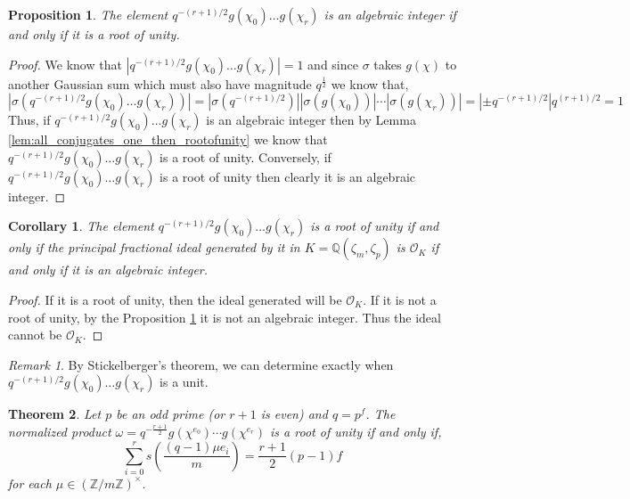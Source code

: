 \documentclass{article}
\newcommand{\Z}{\mathbb{Z}}
\newcommand{\Q}{\mathbb{Q}}
\newcommand{\iO}{\mathcal{O}}
\newtheorem{theorem}{Theorem}[section]
\newtheorem{corollary}{Corollary}[theorem]
\newtheorem{proposition}[theorem]{Proposition}
\theoremstyle{definition}
\theoremstyle{definition}
\theoremstyle{remark}
\newtheorem*{remark}{Remark}
\begin{document}
\begin{proposition} \label{prop:gauss_sum_prod_alg_int}
The element $q^{-(r+1)/2} g(\chi_0) \dots g(\chi_r)$ is an algebraic integer if and only if it is a root of unity.
\end{proposition}
\begin{proof}
We know that $|q^{-(r+1)/2} g(\chi_0) \dots g(\chi_r)| = 1$ and since $\sigma$ takes $g(\chi)$ to another Gaussian sum which must also have magnitude $q^{\frac{1}{2}}$ we know that,
\[ |\sigma(q^{-(r+1)/2} g(\chi_0) \dots g(\chi_r))| = |\sigma(q^{-(r+1)/2})| |\sigma(g(\chi_0))| \cdots |\sigma(g(\chi_r))| = | \pm q^{-(r+1)/2} | q^{(r+1)/2} = 1 \]
Thus, if $q^{-(r+1)/2} g(\chi_0) \dots g(\chi_r)$ is an algebraic integer then by Lemma \ref{lem:all_conjugates_one_then_rootofunity} we know that $q^{-(r+1)/2} g(\chi_0) \dots g(\chi_r)$ is a root of unity. Conversely, if $q^{-(r+1)/2} g(\chi_0) \dots g(\chi_r)$ is a root of unity then clearly it is an algebraic integer. 
\end{proof}

\begin{corollary}
\label{cor:gauss_sum_prod_principal_ideal}
The element $q^{-(r+1)/2} g(\chi_0) \dots g(\chi_r)$ is a root of unity if and only if the principal fractional ideal generated by it in $K = \Q(\zeta_{m}, \zeta_p)$ is $\iO_K$ if and only if it is an algebraic integer.
\end{corollary}

\begin{proof} If it is a root of unity, then the ideal generated will be $\iO_K$. If it is not a root of unity, by the Proposition \ref{prop:gauss_sum_prod_alg_int} it is not an algebraic integer. Thus the ideal cannot be $\iO_K$.
\end{proof}

\begin{remark}
By Stickelberger's theorem, we can determine exactly when $q^{-(r+1)/2}g(\chi_0) \dots g(\chi_r)$ is a unit. 
\end{remark}

\begin{theorem} \label{thm:gauss_sum_is_root_of_unity_ideal_factorization_counting_condition}
Let $p$ be an odd prime (or $r + 1$ is even) and $q = p^f$. The normalized product $\omega = q^{-\frac{r+1}{2}} g(\chi^{e_0}) \cdots g(\chi^{e_r})$ is a root of unity if and only if,
\[ \sum_{i = 0}^r s\left(\frac{(q-1) \mu e_i}{m}\right) = \frac{r+1}{2} (p - 1) f \]
for each $\mu \in (\Z / m \Z)^\times$.
\end{theorem}
\end{document}
